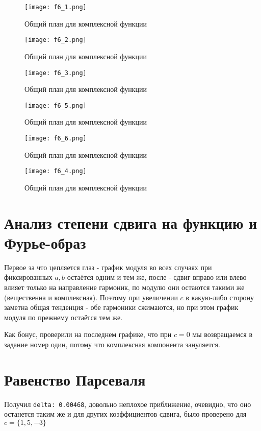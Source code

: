 \begin{figure}[ht]
    \centering
    \texttt{[image: f6\_1.png]}
    \caption{Общий план для комплексной функции}
\end{figure}

\begin{figure}[ht]
    \centering
    \texttt{[image: f6\_2.png]}
    \caption{Общий план для комплексной функции}
\end{figure}

\begin{figure}[ht]
    \centering
    \texttt{[image: f6\_3.png]}
    \caption{Общий план для комплексной функции}
\end{figure}

\begin{figure}[ht]
    \centering
    \texttt{[image: f6\_5.png]}
    \caption{Общий план для комплексной функции}
\end{figure}

\begin{figure}[ht]
    \centering
    \texttt{[image: f6\_6.png]}
    \caption{Общий план для комплексной функции}
\end{figure}

\begin{figure}[ht]
    \centering
    \texttt{[image: f6\_4.png]}
    \caption{Общий план для комплексной функции}
\end{figure}

\section{Анализ степени сдвига на функцию и Фурье-образ}

Первое за что цепляется глаз - график модуля во всех случаях при фиксированных $a,b$ остаётся одним и тем же, после - сдвиг вправо или влево влияет только на направление гармоник, по модулю они остаются такими же (вещественна и комплексная). 
Поэтому при увеличении $c$ в какую-либо сторону заметна общая тенденция - обе гармоники сжимаются, но при этом график модуля по прежнему остаётся тем же.

Как бонус, проверили на последнем графике, что при $c=0$ мы возвращаемся в задание номер один, потому что комплексная компонента зануляется.

\section{Равенство Парсеваля}

Получил \texttt{delta: 0.00468}, довольно неплохое приближение, очевидно, что оно останется таким же и для других коэффициентов сдвига, было проверено для $c=\{1,5,-3\}$

\endinput